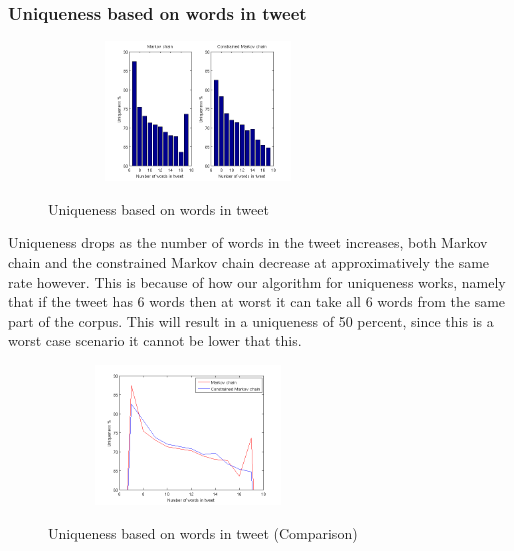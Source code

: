 \documentclass[a4paper,12pt]{article}
\begin{document}
\subsubsection{Uniqueness based on words in tweet}
\begin{figure}[h!]
\hfill
\begin{center}
{\includegraphics[width=300, height = 140]{UniqByNumWordsTweet.png}}
\end{center}
\caption{Uniqueness based on words in tweet}
\end{figure}
Uniqueness drops as the number of words in the tweet increases, both Markov chain and the constrained Markov chain decrease at approximatively the same rate however. This is because of how our algorithm for uniqueness works, namely that if the tweet has 6 words then at worst it can take all 6 words from the same part of the corpus. This will result in a uniqueness of 50 percent, since this is a worst case scenario it cannot be lower that this.
\begin{figure}[h!]
\hfill
\begin{center}
{\includegraphics[width=280, height = 140]{UniqByNumWordsTweet2.png}}
\end{center}
\hfill
\caption{Uniqueness based on words in tweet (Comparison)}
\end{figure}
\end{document}
